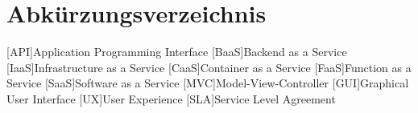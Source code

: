 \clearpage
\chapter*{Abkürzungsverzeichnis}	

\begin{acronym}[XXXXXXX]
	[API]{Application Programming Interface}
	[BaaS]{Backend as a Service}
	[IaaS]{Infrastructure as a Service}
	[CaaS]{Container as a Service}
	[FaaS]{Function as a Service}
	[SaaS]{Software as a Service}
	[MVC]{Model-View-Controller}
	[GUI]{Graphical User Interface}
	[UX]{User Experience}
	[SLA]{Service Level Agreement}
\end{acronym}
